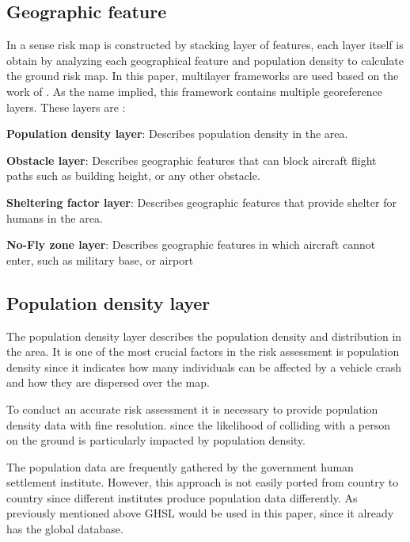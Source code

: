 \documentclass[12pt]{report}
\begin{document}
        \subsection{Geographic feature}
            In a sense risk map is constructed by stacking layer of features, each layer itself is obtain by analyzing
            each geographical feature and population density to calculate the ground risk map. In this paper, multilayer
            frameworks are used based on the work of \cite{primatesta_ground_2020}. As the name implied, this framework contains multiple
            georeference layers. These layers are :
                \begin{myitemize}
                    \item \textbf{Population density layer}: Describes population density in the area.
                    \item \textbf{Obstacle layer}: Describes geographic features that can block aircraft flight paths
                    such as building height, or any other obstacle.
                    \item \textbf{Sheltering factor layer}: Describes geographic features that provide shelter for
                    humans in the area.
                    \item \textbf{No-Fly zone layer}: Describes geographic features in which aircraft cannot enter, such
                    as military base, or airport
                \end{myitemize}

        \subsection{Population density layer}
            The population density layer describes the population density and distribution in the area. It is one of the
            most crucial factors in the risk assessment is population density since it indicates how many individuals
            can be affected by a vehicle crash and how they are dispersed over the map.

            To conduct an accurate risk assessment it is necessary to provide population density data with fine
            resolution. since the likelihood of colliding with a person on the ground is particularly impacted by
            population density.

            The population data are frequently gathered by the government human settlement institute. However, this
            approach is not easily ported from country to country since different institutes produce population data
            differently. As previously mentioned above GHSL would be used in this paper, since it already has the global
            database.
\end{document}
